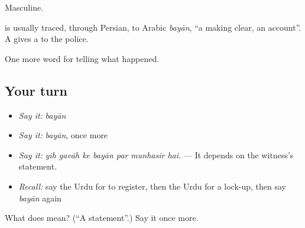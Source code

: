 Masculine.

\begin{cousinweb}
is usually traced, through Persian, to Arabic \emph{bayān}, \textquotedblleft{}a making clear, an account\textquotedblright{}. A \textbf{} gives a \textbf{} to the police.
\end{cousinweb}

\begin{grammarlens}[title={What you've built}]
One more word for telling what happened.
\end{grammarlens}

\subsection*{Your turn}
\begin{itemize}
\raggedright
  \item \emph{Say it:} \emph{bayān}
  \item \emph{Say it:} \emph{bayān}, once more
  \item \emph{Say it:} \emph{yih gavāh ke bayān par munhasir hai.} — It depends on the witness's statement.
  \item \emph{Recall:} say the Urdu for to register, then the Urdu for a lock-up, then say \emph{bayān} again
\end{itemize}

\begin{tcolorbox}[breakable,colback=teal!4,colframe=teal!35!black,title={Before you move on}]
What does  mean? (\textquotedblleft{}A statement\textquotedblright{}.) Say it once more.
\end{tcolorbox}
